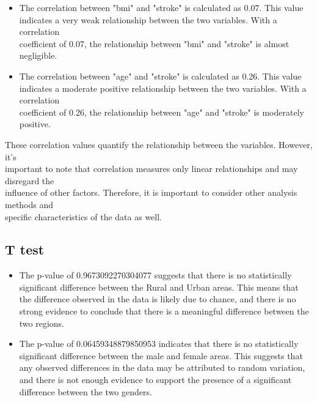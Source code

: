 \documentclass{article}
\begin{document}
\begin{titlepage}
\begin{itemize}
    \item The correlation between "bmi" and "stroke" is calculated as 0.07. This value \\ indicates a very weak relationship between the two variables. With a correlation \\ coefficient of 0.07, the relationship between "bmi" and "stroke" is almost negligible.\\    
    \item The correlation between "age" and "stroke" is calculated as 0.26. This value\\ indicates a moderate positive relationship between the two variables. With a correlation\\ coefficient of 0.26, the relationship between "age" and "stroke" is moderately positive. \\
\end{itemize}

These correlation values quantify the relationship between the variables. However, it's\\important to note that correlation measures only linear relationships and may disregard the \\ influence of other factors. Therefore, it is important to consider other analysis methods and \\specific characteristics of the data as well.


\subsection{T test}

\label{gen_inst}
\begin{itemize}

\item The p-value of 0.9673092270304077 suggests that there is no statistically significant difference between the Rural and Urban areas. This means that the difference observed in the data is likely due to chance, and there is no strong evidence to conclude that there is a meaningful difference between the two regions.

\item The p-value of 0.06459348879850953 indicates that there is no statistically significant difference between the male and female areas. This suggests that any observed differences in the data may be attributed to random variation, and there is not enough evidence to support the presence of a significant difference between the two genders.


\end{itemize}
\end{titlepage}
\end{document}
